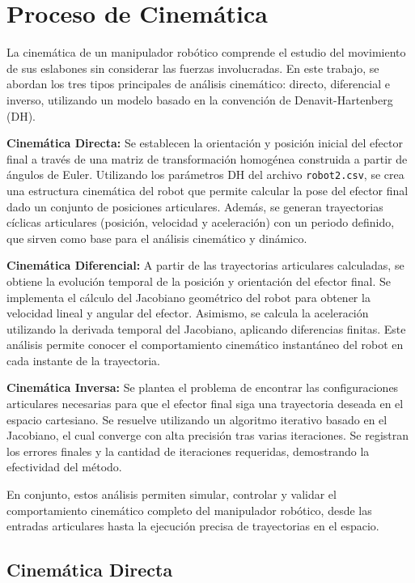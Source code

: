 \section{Proceso de Cinemática} \label{sec:proceso_cinematica}


La cinemática de un manipulador robótico comprende el estudio del movimiento de sus eslabones sin considerar las fuerzas involucradas. En este trabajo, se abordan los tres tipos principales de análisis cinemático: directo, diferencial e inverso, utilizando un modelo basado en la convención de Denavit-Hartenberg (DH).

\textbf{Cinemática Directa:} Se establecen la orientación y posición inicial del efector final a través de una matriz de transformación homogénea construida a partir de ángulos de Euler. Utilizando los parámetros DH del archivo \texttt{robot2.csv}, se crea una estructura cinemática del robot que permite calcular la pose del efector final dado un conjunto de posiciones articulares. Además, se generan trayectorias cíclicas articulares (posición, velocidad y aceleración) con un periodo definido, que sirven como base para el análisis cinemático y dinámico.

\textbf{Cinemática Diferencial:} A partir de las trayectorias articulares calculadas, se obtiene la evolución temporal de la posición y orientación del efector final. Se implementa el cálculo del Jacobiano geométrico del robot para obtener la velocidad lineal y angular del efector. Asimismo, se calcula la aceleración utilizando la derivada temporal del Jacobiano, aplicando diferencias finitas. Este análisis permite conocer el comportamiento cinemático instantáneo del robot en cada instante de la trayectoria.

\textbf{Cinemática Inversa:} Se plantea el problema de encontrar las configuraciones articulares necesarias para que el efector final siga una trayectoria deseada en el espacio cartesiano. Se resuelve utilizando un algoritmo iterativo basado en el Jacobiano, el cual converge con alta precisión tras varias iteraciones. Se registran los errores finales y la cantidad de iteraciones requeridas, demostrando la efectividad del método.

En conjunto, estos análisis permiten simular, controlar y validar el comportamiento cinemático completo del manipulador robótico, desde las entradas articulares hasta la ejecución precisa de trayectorias en el espacio.


\subsection{Cinemática Directa}


